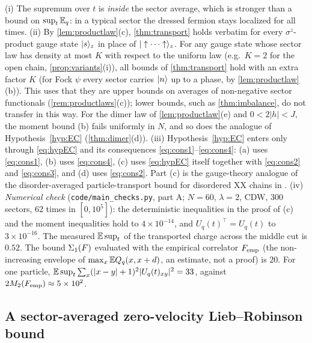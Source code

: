 \begin{remark}\label{rem:main-transport}
(i) The supremum over $t$ is \emph{inside} the sector average, which is stronger than a bound on
$\sup_t\mathbb{E}_q$: in a typical sector the dressed fermion stays localized for all times.
(ii) By \cref{lem:productlaw}(c), \cref{thm:transport} holds verbatim for every $\sigma^z$-product gauge
state $|s\rangle_z$ in place of $|\uparrow\cdots\uparrow\rangle_z$.  For any gauge state whose sector law
has density at most $K$ with respect to the uniform law (e.g.\ $K=2$ for the open chain,
\cref{prop:variants}(i)), all bounds of \cref{thm:transport} hold with an extra factor $K$ (for Fock $\psi$ every
sector carries $|n\rangle$ up to a phase, by \cref{lem:productlaw}(b)).  This uses that they are upper bounds on
averages of non-negative sector functionals (\cref{rem:productlaws}(c)); lower bounds, such as
\cref{thm:imbalance}, do not transfer in this way.  For the dimer law of \cref{lem:productlaw}(e) and
$0<2|h|<J$, the moment bound (b) fails uniformly in $N$, and so does the analogue of
Hypothesis~\ref{hyp:EC} (\cref{thm:dimer}(d)).
(iii) Hypothesis~\ref{hyp:EC} enters only through \eqref{eq:hypEC} and its consequences
\eqref{eq:cons1}--\eqref{eq:cons4}:
(a) uses \eqref{eq:cons1}, (b) uses \eqref{eq:cons4}, (c) uses \eqref{eq:hypEC} itself together with
\eqref{eq:cons2} and \eqref{eq:cons3}, and (d) uses \eqref{eq:cons2}.  Part (c) is the gauge-theory analogue
of the disorder-averaged particle-transport bound for disordered XX chains in
\cite[Thm.~1.1]{ANSS2016}.
(iv) \emph{Numerical check} (\texttt{code/main\_checks.py}, part A; $N=60$, $\lambda=2$, CDW, $300$
sectors, $62$ times in $[0,10^5]$): the deterministic inequalities in the proof of (c) and the moment
inequalities hold to $4\times10^{-14}$, and $U_q(t)^\top=U_q(t)$ to $3\times10^{-16}$.  The measured
$\mathbb{E}\sup_t$ of the transported charge across the middle cut is $0.52$.  The bound $\Sigma_1(F)$ evaluated with
the empirical correlator $F_{\rm emp}$ (the non-increasing envelope of $\max_x\mathbb{E} Q_q(x,x+d)$, an
estimate, not a proof) is $20$.  For one particle, $\mathbb{E}\sup_t\sum_x(|x-y|+1)^2|U_q(t)_{xy}|^2=33$,
against $2M_2(F_{\rm emp})\approx5\times10^2$.
\end{remark}

\subsection{A sector-averaged zero-velocity Lieb--Robinson bound}\label{sec:main:LR}

